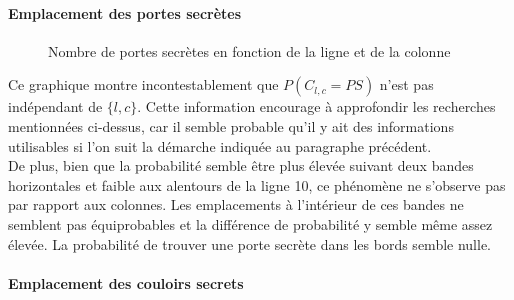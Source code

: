 \documentclass[a4paper,12pt]{article}
\begin{document}
\paragraph{Emplacement des portes secrètes}

\begin{figure}[H]
  \caption{\label{fig:3d_sdoors_graph} Nombre de portes secrètes en fonction
    de la ligne et de la colonne}
\end{figure}

Ce graphique montre incontestablement que $P(C_{l,c} = PS)$ n'est pas indépendant
de $\{l,c\}$. Cette information encourage à approfondir les recherches
mentionnées ci-dessus, car il semble probable qu'il y ait des informations
utilisables si l'on suit la démarche indiquée au paragraphe précédent.
\\
De plus, bien que la probabilité semble être plus élevée suivant deux bandes
horizontales et faible aux alentours de la ligne 10, ce phénomène ne s'observe
pas par rapport aux colonnes. Les emplacements à l'intérieur de ces bandes ne
semblent pas équiprobables et la différence de probabilité y semble même assez
élevée. La probabilité de trouver une porte secrète dans les bords semble nulle.

\paragraph{Emplacement des couloirs secrets}
\end{document}
